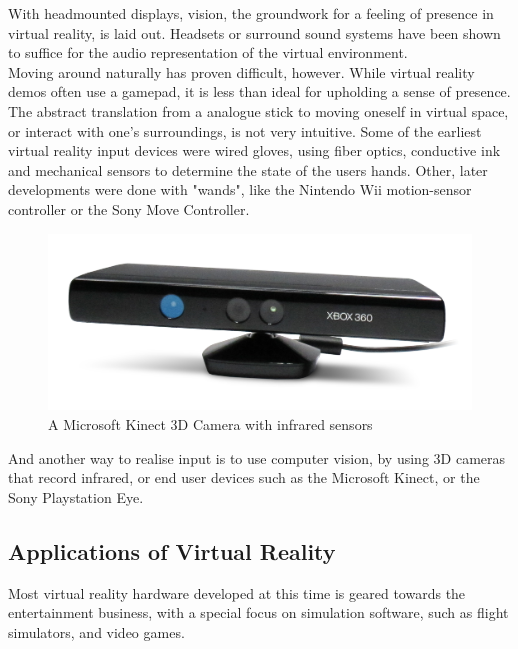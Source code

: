 \documentclass[11pt]{article}
\begin{document}
	With headmounted displays, vision, the groundwork for a feeling of presence in virtual reality, is laid out. Headsets or surround sound systems have been shown to suffice for the audio representation of the virtual environment.\\
	Moving around naturally has proven difficult, however. While virtual reality demos often use a gamepad, it is less than ideal for upholding a sense of presence. The abstract translation from a analogue stick to moving oneself in virtual space, or interact with one's surroundings, is not very intuitive. \cite{ruddle13} Some of the earliest virtual reality input devices were wired gloves, using fiber optics, conductive ink and mechanical sensors to determine the state of the users hands. \cite{boas13} Other, later developments were done with "wands", like the Nintendo Wii motion-sensor controller or the Sony Move Controller. 

	\begin{figure}
		\vspace{-10pt}
		\begin{center}
			\includegraphics[scale=0.1]{images/KinectSensor.png}
		\end{center}			
		\vspace{-20pt}
			\caption{A Microsoft Kinect 3D Camera with infrared sensors}
		\vspace{-10pt}
	\end{figure}	
	
	\cite{boas13} And another way to realise input is to use computer vision, by using 3D cameras that record infrared, or end user devices such as the Microsoft Kinect, or the Sony Playstation Eye. \cite{boas13}
	
	
	
	\subsection{Applications of Virtual Reality}
	Most virtual reality hardware developed at this time is geared towards the entertainment business, with a special focus on simulation software, such as flight simulators, and video games. %
\end{document}
